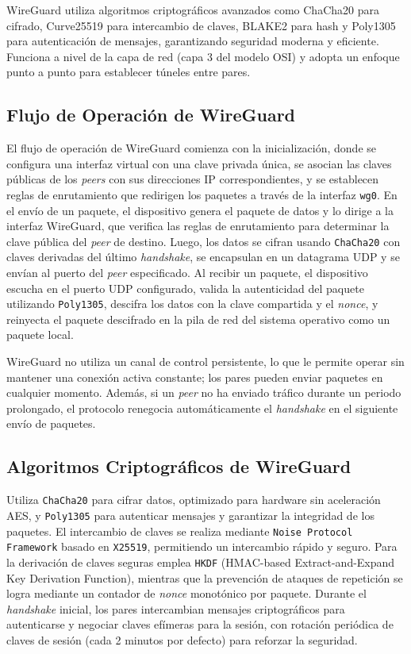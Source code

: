     WireGuard utiliza algoritmos criptográficos avanzados como ChaCha20 para cifrado, Curve25519 para intercambio de claves, BLAKE2 para hash y Poly1305 para autenticación de mensajes, garantizando seguridad moderna y eficiente. Funciona a nivel de la capa de red (capa 3 del modelo OSI) y adopta un enfoque punto a punto para establecer túneles entre pares.

\subsection{Flujo de Operación de WireGuard}  
   El flujo de operación de WireGuard comienza con la inicialización, donde se configura una interfaz virtual con una clave privada única, se asocian las claves públicas de los \textit{peers} con sus direcciones IP correspondientes, y se establecen reglas de enrutamiento que redirigen los paquetes a través de la interfaz \texttt{wg0}. En el envío de un paquete, el dispositivo genera el paquete de datos y lo dirige a la interfaz WireGuard, que verifica las reglas de enrutamiento para determinar la clave pública del \textit{peer} de destino. Luego, los datos se cifran usando \texttt{ChaCha20} con claves derivadas del último \textit{handshake}, se encapsulan en un datagrama UDP y se envían al puerto del \textit{peer} especificado. Al recibir un paquete, el dispositivo escucha en el puerto UDP configurado, valida la autenticidad del paquete utilizando \texttt{Poly1305}, descifra los datos con la clave compartida y el \textit{nonce}, y reinyecta el paquete descifrado en la pila de red del sistema operativo como un paquete local.
  
   WireGuard no utiliza un canal de control persistente, lo que le permite operar sin mantener una conexión activa constante; los pares pueden enviar paquetes en cualquier momento. Además, si un \textit{peer} no ha enviado tráfico durante un periodo prolongado, el protocolo renegocia automáticamente el \textit{handshake} en el siguiente envío de paquetes.
   
   \subsection{Algoritmos Criptográficos de WireGuard}  
   Utiliza \texttt{ChaCha20} para cifrar datos, optimizado para hardware sin aceleración AES, y \texttt{Poly1305} para autenticar mensajes y garantizar la integridad de los paquetes. El intercambio de claves se realiza mediante \texttt{Noise Protocol Framework} basado en \texttt{X25519}, permitiendo un intercambio rápido y seguro. Para la derivación de claves seguras emplea \texttt{HKDF} (HMAC-based Extract-and-Expand Key Derivation Function), mientras que la prevención de ataques de repetición se logra mediante un contador de \textit{nonce} monotónico por paquete. Durante el \textit{handshake} inicial, los pares intercambian mensajes criptográficos para autenticarse y negociar claves efímeras para la sesión, con rotación periódica de claves de sesión (cada 2 minutos por defecto) para reforzar la seguridad.
   
